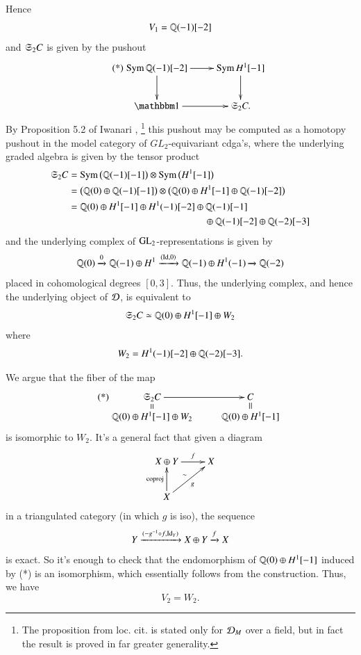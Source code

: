 \subsubsection{}
\label{EB14}
Hence 
\[
V_1 = \mathbb{Q}(-1)[-2]
\]
and $\mathfrak{S}_2C$ is given by the pushout
\[
\tag{*}
\xymatrix{
\Sym \QQ(-1)[-2]
\ar[r] \ar[d]
& \Sym H^1[-1]
\ar[d]
\\
\one
\ar[r]
&
\fkS_2C. 
}
\]
By Proposition 5.2 of Iwanari \cite{Iwanari},
\footnote{The proposition from loc. cit. is stated only for $\mathcal{D}_M$ over a field, but in fact the result is proved in far greater generality.}
this pushout may be computed as a homotopy pushout in the model category of $GL_2$-equivariant cdga's, where the underlying graded algebra is given by the tensor product
\begin{align*} 
\mathfrak{S}_2C 
&= \operatorname{Sym} \big( \mathbb{Q}(-1)[-1] \big) \otimes \operatorname{Sym} \big( H^1[-1] \big) 
\\ 
&= \big( \mathbb{Q}(0) \oplus \mathbb{Q}(-1)[-1] \big) \otimes \big( \mathbb{Q}(0) \oplus H^1[-1] \oplus \mathbb{Q}(-1)[-2] \big) 
\\ 
&= \!\begin{aligned}[t]
\mathbb{Q}(0) \oplus H^1[-1] \oplus H^1(-1)[-2] & \oplus \mathbb{Q}(-1)[-1] \\ 
   &\quad \oplus \mathbb{Q}(-1)[-2] \oplus \mathbb{Q}(-2)[-3] 
   \end{aligned}
\end{align*}
and the underlying complex of $\operatorname{GL}_2$-representations is given by
\[
\mathbb{Q}(0) \xrightarrow{0} 
\mathbb{Q}(-1)\oplus H^1 \xrightarrow{(\mathrm{Id}, 0)} 
\mathbb{Q}(-1) \oplus H^1(-1) \xrightarrow{} \mathbb{Q}(-2)
\]
placed in cohomological degrees $[0,3]$. Thus, the underlying complex, and hence the underlying object of $\mathcal{D}$, is equivalent to 
\[
\mathfrak{S}_2C \simeq 
\mathbb{Q}(0) \oplus H^1[-1] \oplus W_2 
\]
where
\[
W_2 = H^1(-1)[-2] \oplus \mathbb{Q}(-2)[-3].
\]

\sspar{}
\label{EB15}
We argue that the fiber of the map
\[
\tag{*}
\xymatrix
@R=5pt
{
\fkS_2C \ar[r] \ar@{=}[d] 
& C \ar@{=}[d]
\\
\QQ(0) \oplus H^1[-1] \oplus W_2
&
\QQ(0) \oplus H^1[-1]
}
\]
is isomorphic to $W_2$. It's a general fact that given a diagram
\[
\xymatrix{
X \oplus Y \ar[r]^-f & X
\\
X \ar[u]^-{\m{coproj}} \ar[ur]_-g^-\sim
}
\]
in a triangulated category (in which $g$ is iso), the sequence
\[
Y \xrightarrow{(-g^{-1} \circ f, \mathrm{Id}_Y)} X \oplus Y \xrightarrow{f} X
\]
is exact. So it's enough to check that the endomorphism of $\mathbb{Q}(0) \oplus H^1[-1]$ induced by (*) is an isomorphism, which essentially follows from the construction. Thus, we have
\[
V_2 = W_2. 
\]

